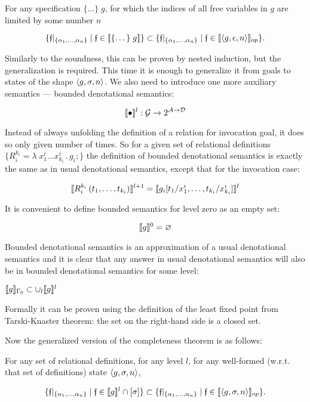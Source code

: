 \begin{theorem}
For any specification $\{\dots\}\; g$, for which the indices of all free variables in $g$ are limited by some number $n$

\[
\{\mathfrak{f}|_{\{\alpha_1,\dots,\alpha_n\}} \mid \mathfrak{f} \in \llbracket{\{\dots\}\; g}\rrbracket\} \subset \{\mathfrak{f}|_{\{\alpha_1,\dots,\alpha_n\}} \mid \mathfrak{f} \in \llbracket{\left<{g, \epsilon, n}\right>}\rrbracket_{op}\}.
\]
\end{theorem}


Similarly to the soundness, this can be proven by nested induction, but the generalization is required. This time it is enough to generalize it from goals
to states of the shape $\left<{g, \sigma, n}\right>$. We also need to introduce one more auxiliary semantics --- bounded denotational semantics:

\[
\llbracket{\bullet}\rrbracket^l : \mathcal{G} \to 2^{\mathcal{A}\to\mathcal{D}}
\]

Instead of always unfolding the definition of a relation for invocation goal, it does so only given number of times. So for a given set of relational
definitions $\{R_i^{k_i} = \lambda\;x_1^i\dots x_{k_i}^i\,.\, g_i;\}$ the definition of bounded denotational semantics is exactly the same as in usual denotational semantics,
except that for the invocation case:

\[
\llbracket{R_i^{k_i}\,(t_1,\dots,t_{k_i})}\rrbracket^{l+1} = \llbracket{g_i[t_1/x_1^i, \dots, t_{k_i}/x_{k_i}^i]}\rrbracket^{l}
\]

It is convenient to define bounded semantics for level zero as an empty set:

\[
\llbracket{g}\rrbracket^{0} = \varnothing
\]

Bounded denotational semantics is an approximation of a usual denotational semantics and it is clear that any answer in usual denotational semantics will also be in
bounded denotational semantics for some level:

\begin{lemma}
$\llbracket{g}\rrbracket_{\Gamma_0} \subset \cup_l \llbracket{g}\rrbracket^l$
\end{lemma}

Formally it can be proven using the definition of the least fixed point from Tarski-Knaster theorem: the set on the right-hand side is a closed set.

Now the generalized version of the completeness theorem is as follows:

\begin{lemma}
For any set of relational definitions, for any level $l$, for any well-formed (w.r.t. that set of definitions) state $\left<{g, \sigma, n}\right>$,

\[
\{\mathfrak{f}|_{\{\alpha_1,\dots,\alpha_n\}} \mid \mathfrak{f} \in \llbracket{g}\rrbracket^l \cap [\sigma]\} \subset \{\mathfrak{f}|_{\{\alpha_1,\dots,\alpha_n\}} \mid \mathfrak{f} \in \llbracket{\left<{g, \sigma, n}\right>}\rrbracket_{op}\}.
\]
\end{lemma}

